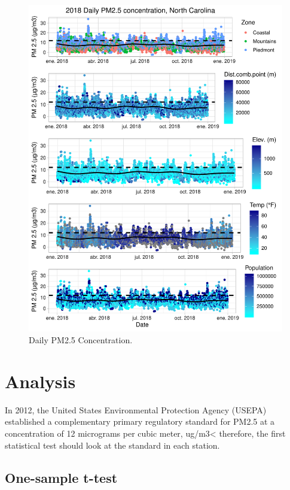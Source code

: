 \documentclass[12pt,]{article}
\begin{document}
\begin{figure}
\centering
\includegraphics{Raby_ENV872_Project_files/figure-latex/unnamed-chunk-39-1.pdf}
\caption{Daily PM2.5 Concentration. \label{PM25plot}}
\end{figure}

\newpage

\section{Analysis}\label{analysis}

In 2012, the United States Environmental Protection Agency (USEPA)
established a complementary primary regulatory standard for PM2.5 at a
concentration of 12 micrograms per cubic meter, ug/m3\textless{}
therefore, the first statistical test should look at the standard in
each station.

\subsection{One-sample t-test}\label{one-sample-t-test}
\end{document}
